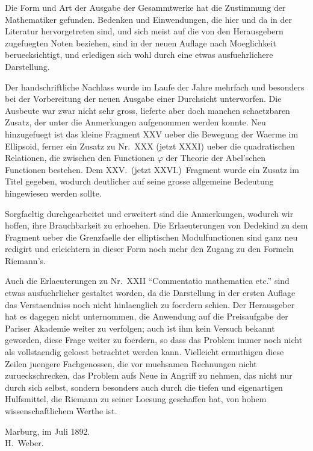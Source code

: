 \documentclass[11pt,a4paper]{article}
\theoremstyle{plain}
\theoremstyle{definition}
\begin{document}
Die Form und Art der Ausgabe der Gesammtwerke hat die Zustimmung der Mathematiker gefunden. Bedenken und Einwendungen, die hier und da in der Literatur hervorgetreten sind, und sich meist auf die von den Herausgebern zugefuegten Noten beziehen, sind in der neuen Auflage nach Moeglichkeit beruecksichtigt, und erledigen sich wohl durch eine etwas ausfuehrlichere Darstellung.

Der handschriftliche Nachlass wurde im Laufe der Jahre mehrfach und besonders bei der Vorbereitung der neuen Ausgabe einer Durchsicht unterworfen. Die Ausbeute war zwar nicht sehr gross, lieferte aber doch manchen schaetzbaren Zusatz, der unter die Anmerkungen aufgenommen werden konnte. Neu hinzugefuegt ist das kleine Fragment XXV ueber die Bewegung der Waerme im Ellipsoid, ferner ein Zusatz zu Nr.\ XXX (jetzt XXXI) ueber die quadratischen Relationen, die zwischen den Functionen $\varphi$ der Theorie der Abel'schen Functionen bestehen. Dem XXV.\ (jetzt XXVI.)\ Fragment wurde ein Zusatz im Titel gegeben, wodurch deutlicher auf seine grosse allgemeine Bedeutung hingewiesen werden sollte.

Sorgfaeltig durchgearbeitet und erweitert sind die Anmerkungen, wodurch wir hoffen, ihre Brauchbarkeit zu erhoehen. Die Erlaeuterungen von Dedekind zu dem Fragment ueber die Grenzfaelle der elliptischen Modulfunctionen sind ganz neu redigirt und erleichtern in dieser Form noch mehr den Zugang zu den Formeln Riemann's.

Auch die Erlaeuterungen zu Nr.\ XXII ``Commentatio mathematica etc.'' sind etwas ausfuehrlicher gestaltet worden, da die Darstellung in der ersten Auflage das Verstaendniss noch nicht hinlaenglich zu foerdern schien. Der Herausgeber hat es dagegen nicht unternommen, die Anwendung auf die Preisaufgabe der Pariser Akademie weiter zu verfolgen; auch ist ihm kein Versuch bekannt geworden, diese Frage weiter zu foerdern, so dass das Problem immer noch nicht als vollstaendig geloest betrachtet werden kann. Vielleicht ermuthigen diese Zeilen juengere Fachgenossen, die vor muehsamen Rechnungen nicht zurueckschrecken, das Problem aufs Neue in Angriff zu nehmen, das nicht nur durch sich selbst, sondern besonders auch durch die tiefen und eigenartigen Hulfsmittel, die Riemann zu seiner Loesung geschaffen hat, von hohem wissenschaftlichem Werthe ist.

\begin{flushright}
Marburg, im Juli 1892.\\
H.\ Weber.
\end{flushright}
\end{document}
